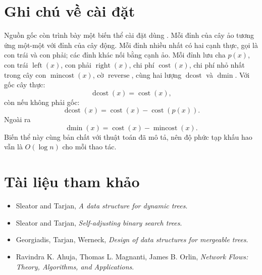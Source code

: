 \documentclass[11pt]{article}
\begin{document}
\section{Ghi chú về cài đặt}

Nguồn gốc còn trình bày một biến thể cài đặt dùng . Mỗi đỉnh của
cây ảo tương ứng một-một với đỉnh của cây động. Mỗi đỉnh nhiều nhất có hai
cạnh thực, gọi là con trái và con phải; các đỉnh khác nối bằng cạnh ảo. Mỗi
đỉnh lưu cha \(p(x)\), con trái \(\operatorname{left}(x)\), con phải
\(\operatorname{right}(x)\), chi phí \(\operatorname{cost}(x)\), chi phí nhỏ
nhất trong cây con \(\operatorname{mincost}(x)\), cờ
\(\operatorname{reverse}\), cùng hai lượng \(\operatorname{dcost}\) và
\(\operatorname{dmin}\). Với gốc cây thực:
\[
  \operatorname{dcost}(x)=\operatorname{cost}(x),
\]
còn nếu không phải gốc:
\[
  \operatorname{dcost}(x)=\operatorname{cost}(x)-\operatorname{cost}(p(x)).
\]
Ngoài ra
\[
  \operatorname{dmin}(x)=\operatorname{cost}(x)-\operatorname{mincost}(x).
\]
Biến thể này cùng bản chất với thuật toán đã mô tả, nên độ phức tạp khấu hao
vẫn là \(O(\log n)\) cho mỗi thao tác.

\section*{Tài liệu tham khảo}

\begin{itemize}
  \item Sleator and Tarjan, \textit{A data structure for dynamic trees}.
  \item Sleator and Tarjan, \textit{Self-adjusting binary search trees}.
  \item Georgiadis, Tarjan, Werneck, \textit{Design of data structures for
  mergeable trees}.
  \item Ravindra K. Ahuja, Thomas L. Magnanti, James B. Orlin,
  \textit{Network Flows: Theory, Algorithms, and Applications}.
\end{itemize}
\end{document}
